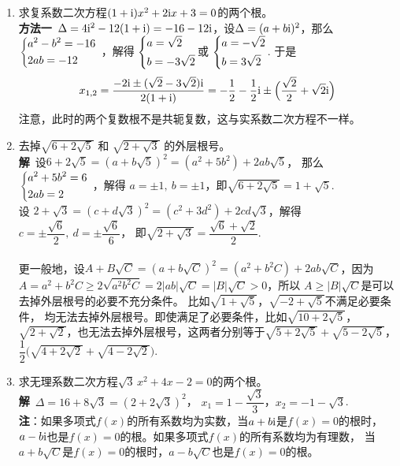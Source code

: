 \begin{enumerate}[label={【\textbf{例\thechapter.\arabic*}】},
 leftmargin=\inteval{\myenumleftmargin}pt,
 itemsep=\inteval{\myenumitempsep}pt,
 itemindent=\inteval{\myenumitemindent}pt]
\item 求复系数二次方程$ (1+\mathrm{i})x^2+2\mathrm{i} x+3=0 $的两个根。\\
\textbf{方法一}\ $ \Delta=4\mathrm{i}^2-12(1+\mathrm{i})=-16-12\mathrm{i} $，设$ \Delta=(a+b\mathrm{i})^2 $，那么
$ \begin{dcases}
    a^2-b^2 =-16 \\
    2ab =-12
\end{dcases} $ ，解得
$ \begin{dcases}
    a=\sqrt{2} \\
    b=-3\sqrt{2}
\end{dcases} $或
$ \begin{dcases}
    a=-\sqrt{2} \\
    b=3\sqrt{2}
\end{dcases} $. 
于是
\begin{gather*}
    x_{1,2}=\dfrac{-2\mathrm{i}\pm (\sqrt{2}-3\sqrt{2})\mathrm{i}}{2(1+\mathrm{i})}=-\dfrac{1}{2}
    -\dfrac{1}{2}\mathrm{i}\pm \Big(\dfrac{\sqrt{2}}{2}+\sqrt{2} \mathrm{i}\Big)
\end{gather*}
注意，此时的两个复数根不是共轭复数，这与实系数二次方程不一样。

\item 去掉$ \sqrt{6+2\sqrt{5}} $ 和 $ \sqrt{2+\sqrt{3}} $ 
的外层根号。\\
\textbf{解}\ 设$ 6+2\sqrt{5}=(a+b\sqrt{5})^2=(a^2+5b^2)+2ab\sqrt{5}$，
那么
$ \begin{dcases}
    a^2+5b^2 = 6 \\
    2ab = 2
\end{dcases} $ ，解得
$ a=\pm 1,\ b=\pm 1 $，即$ \sqrt{6+2\sqrt{5}}=1+\sqrt{5} $. \\
设 $ 2+\sqrt{3}=(c+d\sqrt{3})^2=(c^2+3d^2)+
2cd\sqrt{3} $，解得$ c=\pm \dfrac{\sqrt{6}}{2},\ d=\pm \dfrac{\sqrt{6}}{6} $，
即$  \sqrt{2+\sqrt{3}} = \dfrac{\sqrt{6}+\sqrt{2}}{2} $.  \\
\\
更一般地，设$ A+B\sqrt{C}=(a+b\sqrt{C})^2=(a^2+b^2C)+2ab\sqrt{C} $，因为
$ A=a^2+b^2C \geq 2\sqrt{a^2b^2C} =2|ab|\sqrt{C}=|B|\sqrt{C}>0 $，所以
$ A\geq |B|\sqrt{C} $是可以去掉外层根号的必要不充分条件。
比如$ \sqrt{1+\sqrt{5}} $，$ \sqrt{-2+\sqrt{5}} $不满足必要条件，
均无法去掉外层根号。即使满足了必要条件，比如$ \sqrt{10+2\sqrt{5}} $，
$ \sqrt{2+\sqrt{2}} $，也无法去掉外层根号，这两者分别等于$ \sqrt{5+2\sqrt{5}}+
\sqrt{5-2\sqrt{5}} $，$ \dfrac{1}{2}\bigl(\sqrt{4+2\sqrt{2}}+
\sqrt{4-2\sqrt{2}}\bigr) $. 

\item 求无理系数二次方程$ \sqrt{3}\, x^2+4x-2=0 $的两个根。\\
\textbf{解}\ $ \Delta=16+8\sqrt{3}=(2+2\sqrt{3})^2 $，
$ x_1=1-\dfrac{\sqrt{3}}{3} $，$ x_2=-1-\sqrt{3} $. \\
\textbf{注}：如果多项式$ f(x) $的所有系数均为实数，当$ a+b\mathrm{i} $是$ f(x)=0 $的根时，
$ a-b\mathrm{i} $也是$ f(x)=0 $的根。如果多项式$ f(x) $的所有系数均为有理数，
当$ a+b\sqrt{C} $是$ f(x)=0 $的根时，$ a-b\sqrt{C} $也是$ f(x)=0 $的根。


\end{enumerate}
